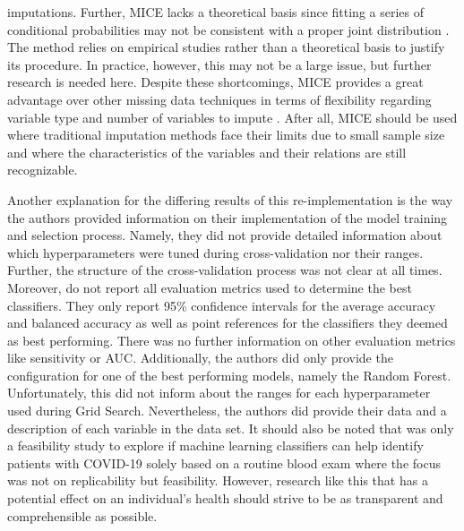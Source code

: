 imputations. Further, MICE lacks a theoretical basis since fitting a series of 
conditional probabilities may not be consistent with a proper joint 
distribution 
\cite{RN141}. The method relies on empirical studies rather than a theoretical 
basis to justify its procedure. In practice, however, this may not be a large 
issue, but further research is needed here. Despite these shortcomings, MICE 
provides a great advantage over other missing data techniques in terms of 
flexibility regarding variable type and number of variables to impute 
\cite{RN141, RN142}. After all, MICE should be used where traditional 
imputation methods face their limits due to small sample size and where the 
characteristics of the variables and their relations are still recognizable.
\par
Another explanation for the differing results of this re-implementation is the 
way the authors provided information on their implementation of the model 
training and selection process. Namely, they did not provide detailed 
information about which hyperparameters were tuned during cross-validation nor 
their ranges. Further, the structure of the cross-validation process was not 
clear at all times.
\\
Moreover, \citeauthor{RN127} do not report all evaluation metrics used to 
determine the best classifiers. They only report 95\% confidence intervals for 
the average accuracy and balanced accuracy as well as point references for the 
classifiers they deemed as best performing. There was no further information 
on other evaluation metrics like sensitivity or AUC. Additionally, the authors 
did only provide the configuration for one of the best performing models, 
namely the Random Forest. Unfortunately, this did not inform about the ranges 
for each hyperparameter used during Grid Search.
Nevertheless, the authors did provide their data and a description of each 
variable in the data set. It should also be noted that \cite{RN127} was only a 
feasibility study to explore if machine learning classifiers can help identify 
patients with COVID-19 solely based on a routine blood exam where the focus was 
not on replicability but feasibility. However, research like this that has a 
potential effect on an individual's health should strive to be as transparent 
and comprehensible as possible.
